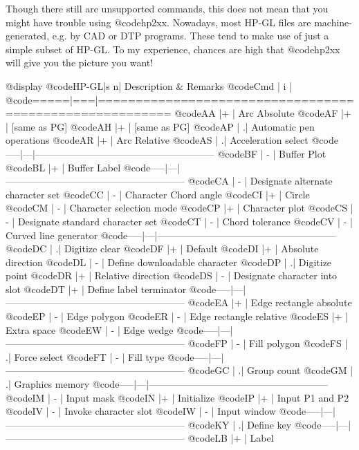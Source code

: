 Though there still are unsupported commands, this does not mean that
you might have trouble using @code{hp2xx}. Nowadays, most HP-GL files are
machine-generated, e.g. by CAD or DTP programs. These tend to make use
of just a simple subset of HP-GL. To my experience, chances are high
that @code{hp2xx} will give you the picture you want!

@display
@code{HP-GL|s n| Description & Remarks}
@code{Cmd  | i |}
@code{=====|===|========================================================}
@code{AA   |+  | Arc Absolute}
@code{AF   |+  | [same as PG]}
@code{AH   |+  | [same as PG]}
@code{AP   |  .| Automatic pen operations}
@code{AR   |+  | Arc Relative}
@code{AS   |  .| Acceleration select}
@code{-----|---|--------------------------------------------------------}
@code{BF   | - | Buffer Plot}
@code{BL   |+  | Buffer Label}
@code{-----|---|--------------------------------------------------------}
@code{CA   | - | Designate alternate character set}
@code{CC   | - | Character Chord angle}
@code{CI   |+  | Circle}
@code{CM   | - | Character selection mode}
@code{CP   |+  | Character plot}
@code{CS   | - | Designate standard character set}
@code{CT   | - | Chord tolerance}
@code{CV   | - | Curved line generator}
@code{-----|---|--------------------------------------------------------}
@code{DC   |  .| Digitize clear}
@code{DF   |+  | Default}
@code{DI   |+  | Absolute direction}
@code{DL   | - | Define downloadable character}
@code{DP   |  .| Digitize point}
@code{DR   |+  | Relative direction}
@code{DS   | - | Designate character into slot}
@code{DT   |+  | Define label terminator}
@code{-----|---|--------------------------------------------------------}
@code{EA   |+  | Edge rectangle absolute}
@code{EP   | - | Edge polygon}
@code{ER   | - | Edge rectangle relative}
@code{ES   |+  | Extra space}
@code{EW   | - | Edge wedge}
@code{-----|---|--------------------------------------------------------}
@code{FP   | - | Fill polygon}
@code{FS   |  .| Force select}
@code{FT   | - | Fill type}
@code{-----|---|--------------------------------------------------------}
@code{GC   |  .| Group count}
@code{GM   |  .| Graphics memory}
@code{-----|---|--------------------------------------------------------}
@code{IM   | - | Input mask}
@code{IN   |+  | Initialize}
@code{IP   |+  | Input P1 and P2}
@code{IV   | - | Invoke character slot}
@code{IW   | - | Input window}
@code{-----|---|--------------------------------------------------------}
@code{KY   |  .| Define key}
@code{-----|---|--------------------------------------------------------}
@code{LB   |+  | Label}
